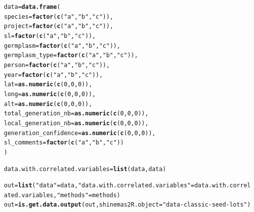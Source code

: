 \documentclass{article}\usepackage[]{graphicx}\usepackage[]{color}
\makeatletter
\newcommand{\hlnum}[1]{\textcolor[rgb]{0.686,0.059,0.569}{#1}}%
\newcommand{\hlstr}[1]{\textcolor[rgb]{0.192,0.494,0.8}{#1}}%
\newcommand{\hlstd}[1]{\textcolor[rgb]{0.345,0.345,0.345}{#1}}%
\newcommand{\hlkwb}[1]{\textcolor[rgb]{0.69,0.353,0.396}{#1}}%
\newcommand{\hlkwc}[1]{\textcolor[rgb]{0.333,0.667,0.333}{#1}}%
\newcommand{\hlkwd}[1]{\textcolor[rgb]{0.737,0.353,0.396}{\textbf{#1}}}%
\newenvironment{kframe}{%
 \def\at@end@of@kframe{}%
 \ifinner\ifhmode%
  \def\at@end@of@kframe{\end{minipage}}%
  \begin{minipage}{\columnwidth}%
 \fi\fi%
 \def\FrameCommand##1{\hskip\@totalleftmargin \hskip-\fboxsep
 \colorbox{shadecolor}{##1}\hskip-\fboxsep
     \hskip-\linewidth \hskip-\@totalleftmargin \hskip\columnwidth}%
 \MakeFramed {\advance\hsize-\width
   \@totalleftmargin\z@ \linewidth\hsize
   \@setminipage}}%
 {\par\unskip\endMakeFramed%
 \at@end@of@kframe}
\newenvironment{knitrout}{}{} %
\makeatother
\begin{document}
\begin{appendices}
\begin{knitrout}
\color{fgcolor}\begin{kframe}
\begin{alltt}
\hlstd{data} \hlkwb{=} \hlkwd{data.frame}\hlstd{(}
        \hlkwc{species} \hlstd{=} \hlkwd{factor}\hlstd{(}\hlkwd{c}\hlstd{(}\hlstr{"a"}\hlstd{,} \hlstr{"b"}\hlstd{,} \hlstr{"c"}\hlstd{)),}
        \hlkwc{project} \hlstd{=} \hlkwd{factor}\hlstd{(}\hlkwd{c}\hlstd{(}\hlstr{"a"}\hlstd{,} \hlstr{"b"}\hlstd{,} \hlstr{"c"}\hlstd{)),}
        \hlkwc{sl} \hlstd{=} \hlkwd{factor}\hlstd{(}\hlkwd{c}\hlstd{(}\hlstr{"a"}\hlstd{,} \hlstr{"b"}\hlstd{,} \hlstr{"c"}\hlstd{)),}
        \hlkwc{germplasm} \hlstd{=} \hlkwd{factor}\hlstd{(}\hlkwd{c}\hlstd{(}\hlstr{"a"}\hlstd{,} \hlstr{"b"}\hlstd{,} \hlstr{"c"}\hlstd{)),}
        \hlkwc{germplasm_type} \hlstd{=} \hlkwd{factor}\hlstd{(}\hlkwd{c}\hlstd{(}\hlstr{"a"}\hlstd{,} \hlstr{"b"}\hlstd{,} \hlstr{"c"}\hlstd{)),}
        \hlkwc{person} \hlstd{=} \hlkwd{factor}\hlstd{(}\hlkwd{c}\hlstd{(}\hlstr{"a"}\hlstd{,} \hlstr{"b"}\hlstd{,} \hlstr{"c"}\hlstd{)),}
        \hlkwc{year} \hlstd{=} \hlkwd{factor}\hlstd{(}\hlkwd{c}\hlstd{(}\hlstr{"a"}\hlstd{,} \hlstr{"b"}\hlstd{,} \hlstr{"c"}\hlstd{)),}
        \hlkwc{lat} \hlstd{=} \hlkwd{as.numeric}\hlstd{(}\hlkwd{c}\hlstd{(}\hlnum{0}\hlstd{,} \hlnum{0}\hlstd{,} \hlnum{0}\hlstd{)),}
        \hlkwc{long} \hlstd{=} \hlkwd{as.numeric}\hlstd{(}\hlkwd{c}\hlstd{(}\hlnum{0}\hlstd{,} \hlnum{0}\hlstd{,} \hlnum{0}\hlstd{)),}
        \hlkwc{alt} \hlstd{=} \hlkwd{as.numeric}\hlstd{(}\hlkwd{c}\hlstd{(}\hlnum{0}\hlstd{,} \hlnum{0}\hlstd{,} \hlnum{0}\hlstd{)),}
        \hlkwc{total_generation_nb} \hlstd{=} \hlkwd{as.numeric}\hlstd{(}\hlkwd{c}\hlstd{(}\hlnum{0}\hlstd{,} \hlnum{0}\hlstd{,} \hlnum{0}\hlstd{)),}
        \hlkwc{local_generation_nb} \hlstd{=} \hlkwd{as.numeric}\hlstd{(}\hlkwd{c}\hlstd{(}\hlnum{0}\hlstd{,} \hlnum{0}\hlstd{,} \hlnum{0}\hlstd{)),}
        \hlkwc{generation_confidence} \hlstd{=} \hlkwd{as.numeric}\hlstd{(}\hlkwd{c}\hlstd{(}\hlnum{0}\hlstd{,} \hlnum{0}\hlstd{,} \hlnum{0}\hlstd{)),}
        \hlkwc{sl_comments} \hlstd{=} \hlkwd{factor}\hlstd{(}\hlkwd{c}\hlstd{(}\hlstr{"a"}\hlstd{,} \hlstr{"b"}\hlstd{,} \hlstr{"c"}\hlstd{))}
        \hlstd{)}

\hlstd{data.with.correlated.variables} \hlkwb{=} \hlkwd{list}\hlstd{(data, data)}

\hlstd{out} \hlkwb{=} \hlkwd{list}\hlstd{(}\hlstr{"data"} \hlstd{= data,} \hlstr{"data.with.correlated.variables"} \hlstd{= data.with.correlated.variables,} \hlstr{"methods"} \hlstd{= methods)}
\hlstd{out} \hlkwb{=} \hlkwd{is.get.data.output}\hlstd{(out,} \hlkwc{shinemas2R.object} \hlstd{=} \hlstr{"data-classic-seed-lots"}\hlstd{)}
\end{alltt}



\end{kframe}
\end{knitrout}
\end{appendices}
\end{document}
